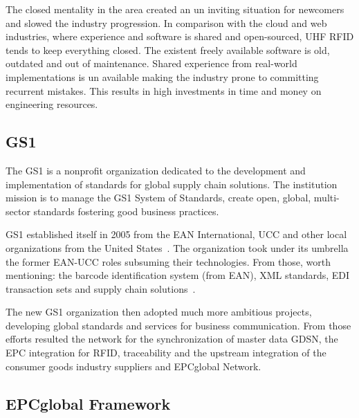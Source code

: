 The closed mentality in the area created an un inviting situation for newcomers and slowed the industry progression. In comparison with the cloud and web industries, where experience and software is shared and open-sourced, \gls{UHF RFID} tends to keep everything closed. The existent freely available software is old, outdated and out of maintenance. Shared experience from real-world implementations is un available making the industry prone to committing recurrent mistakes. This results in high investments in time and money on engineering resources.




\subsection{GS1}

The GS1 is a nonprofit organization dedicated to the development and implementation of standards for global \gls{supply chain} solutions. 
The institution mission is to manage the GS1 System of Standards, create open, global, multi-sector standards fostering good business practices.

GS1 established itself in 2005 from the \gls{EAN} International, \gls{UCC} and other local organizations from the United States~\cite{PublicationLEBENSMITTELZEITUNGa}.
The organization took under its umbrella the former EAN-UCC roles subsuming their technologies. From those, worth mentioning: the barcode identification system (from \gls{EAN}), \gls{XML} standards, \gls{EDI} transaction sets and \gls{supply chain} solutions~\cite[p.~212]{lahiriRFIDSourcebook2005}.

The new GS1 organization then adopted much more ambitious projects, developing global standards and services for business communication.
From those efforts resulted the network for the synchronization of master data \gls{GDSN}, the \gls{EPC} integration for \gls{RFID}, traceability and the upstream integration of the consumer goods industry suppliers and EPCglobal Network.

\subsection{EPCglobal Framework}

